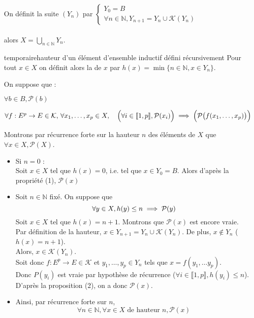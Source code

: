 \begin{demonstration}
    On définit la suite $(Y_n)$ par $\begin{cases}
        Y_0 =  B \\
        \forall n \in \mathbb{N}, Y_{n+1} = Y_n \cup \mathcal{K}(Y_n)
    \end{cases}$ \\ \\
    alors $X = \bigcup_{n \in \mathbb{N}}Y_n$. 
    \begin{definition}{temporaire}{hauteur d'un élément d'ensemble inductif défini récursivement}
        Pour tout $x \in X$ on définit alors la  de $x$ par $h(x) = \min \{n \in \mathbb{N}, x \in Y_n\}$.
    \end{definition}
    On suppose que : 
    \begin{enumeratebf}
        \item $\forall b \in B, \mathcal{P}(b)$
        \item $\forall f : E^p \rightarrow E \in \mathcal{K}, \, \forall x_1,\ldots, x_p \in X, \quad \Bigl(\forall i \in \llbracket 1,p \rrbracket, \mathcal{P}(x_i)\Bigr) \implies \Bigl(\mathcal{P}\bigl(f(x_1,\ldots,x_p)\bigr)\Bigr)$
    \end{enumeratebf}
    Montrons par récurrence forte sur la hauteur $n$ des éléments de $X$ que $\forall x \in X, \mathcal{P}(X)$.
    \begin{itemize}
        \item Si $n = 0$ : \\Soit $x \in X$ tel que $h(x) = 0$, i.e. tel que $x \in Y_0 = B$. Alors d'après la propriété (1), $\mathcal{P}(x)$
        \item Soit $n \in \mathbb{N}$ fixé. On suppose que $$\forall y \in X, h(y) \leq n \implies \mathcal{P}(y)$$ Soit $x \in X$ tel que $h(x) = n+1$. Montrons que $\mathcal{P}(x)$ est encore vraie.\\Par définition de la hauteur, $x \in Y_{n+1} = Y_{n} \cup \mathcal{K}(Y_n)$. De plus, $x \notin Y_n$ ($h(x) = n+1$).\\Alors, $x \in \mathcal{K}(Y_n)$.\\Soit donc $f : E^p \rightarrow E \in \mathcal{K}$ et $y_1, \ldots, y_p \in Y_n$ tels que $x = f(y_1,\ldots y_p)$.\\Donc $P(y_i)$ est vraie par hypothèse de récurrence ($\forall i \in \llbracket 1,p \rrbracket, h(y_i) \leq n$).\\D'après la proposition (2), on a donc $\mathcal{P}(x)$. 
        \item Ainsi, par récurrence forte sur $n$, $$\forall n \in \mathbb{N}, \forall x \in X \text{ de hauteur } n, \mathcal{P}(x)$$
    \end{itemize}
\end{demonstration}

